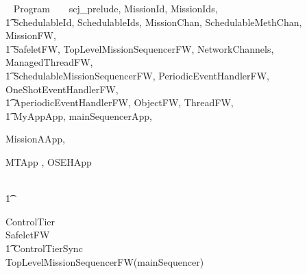 
%
\begin{zsection}
  \SECTION ~ Program ~ \parents ~ scj\_prelude, MissionId, MissionIds, \\
  \t1 SchedulableId, SchedulableIds, MissionChan, SchedulableMethChan, MissionFW,\\
  \t1 SafeletFW, TopLevelMissionSequencerFW, NetworkChannels, ManagedThreadFW, \\
  \t1 SchedulableMissionSequencerFW, PeriodicEventHandlerFW, OneShotEventHandlerFW,\\
  \t1 AperiodicEventHandlerFW, ObjectFW, ThreadFW, \\
  \t1 MyAppApp, mainSequencerApp,

MissionAApp,

MTApp
	,
OSEHApp
	
\\ \t1
	
	
\end{zsection}
%
\begin{circus}
\circprocess ControlTier \circdef \\
\circblockopen
SafeletFW \\
\t1 \lpar ControlTierSync \rpar \\
TopLevelMissionSequencerFW(mainSequencer)
\circblockclose
\end{circus}
%


